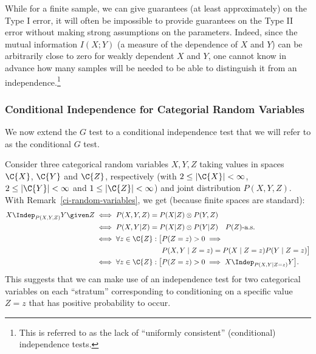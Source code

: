 While for a finite sample, we can give guarantees (at least approximately) on the Type I error, it will often be
impossible to provide guarantees on the Type II error without making strong
assumptions on the parameters. Indeed, since the mutual information $I(X;Y)$ (a measure of
the dependence of $X$ and $Y$) can be arbitrarily close to zero for weakly dependent $X$ 
and $Y$, one cannot know in advance how many samples will be needed to be able to distinguish
it from an independence.\footnote{This is referred to as the lack of ``uniformly consistent''
(conditional) independence tests.}

\subsubsection{Conditional Independence for Categorial Random Variables}

We now extend the $G$ test to a conditional independence test that we will refer to as the conditional $G$ test.

Consider three categorical random variables $X,Y,Z$ taking values in spaces $\C{X}$, $\C{Y}$
and $\C{Z}$, respectively (with $2 \le |\C{X}| < \infty$, $2 \le |\C{Y}| < \infty$ and $1 \le |\C{Z}| < \infty$) and joint distribution $P(X,Y,Z)$.
With Remark~\ref{ci-random-variables}, we get (because finite spaces are standard):
\begin{equation*}\begin{split}
  X \Indep_{P(X,Y,Z)} Y \given Z 
  & \iff P(X,Y,Z) = P(X | Z) \otimes P(Y,Z) \\
  & \iff P(X,Y | Z) = P(X | Z) \otimes P(Y | Z) \quad \text{$P(Z)$-a.s.} \\
  & \begin{split}
    {} \iff \forall z \in \C{Z}: \big[ & P(Z=z) > 0 \implies \\
    & P(X,Y \mid Z=z) = P(X \mid Z=z) P(Y \mid Z=z) \big]
  \end{split} \\
  & \iff \forall z \in \C{Z}: \big[P(Z=z) > 0 \implies X \Indep_{P(X,Y \mid Z=z)} Y \big].
\end{split}\end{equation*}
This suggests that we can make use of an independence test for two categorical variables
on each  ``stratum'' corresponding to conditioning on a specific value $Z=z$ that has
positive probability to occur.

